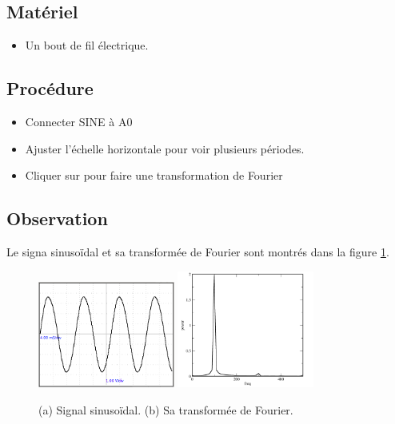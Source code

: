 \documentclass{book}
\begin{document}
\subsection{Matériel}


\begin{itemize}
  \item Un bout de fil électrique.
\end{itemize}

\subsection{Procédure}


\begin{itemize}
  \item Connecter SINE à A0
  \item Ajuster l'échelle horizontale pour voir plusieurs périodes.
  \item Cliquer sur   pour faire une transformation de Fourier
\end{itemize}

\subsection{Observation}


Le signa sinusoïdal et sa transformée de Fourier sont montrés dans la figure  \ref{fig:Sine-wave-and}.
\begin{figure}[h!]
\begin{center}
\caption{\label{fig:Sine-wave-and}(a) Signal sinusoïdal. (b) Sa transformée de Fourier. }\vspace{0.5em}
\includegraphics[width=0.4\textwidth, height=0.3\textwidth, keepaspectratio]{Schematic-sinewave.png}
\includegraphics[width=0.4\textwidth, height=0.3\textwidth, keepaspectratio]{Pic-sine90hz-fft.png}
\end{center}
\end{figure}
\end{document}
